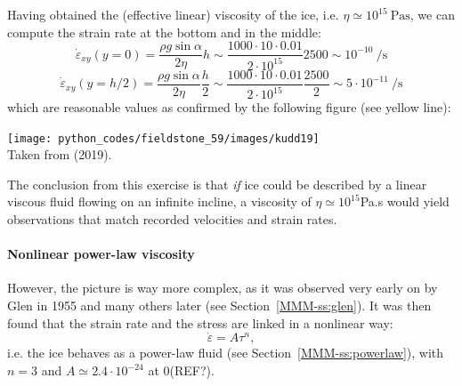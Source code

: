 Having obtained the (effective linear) viscosity of the ice, i.e. 
$\eta\simeq 10^{15}~\si{\pascal\second}$,
we can compute the strain rate at the bottom and in the middle:
\[
\dot{\varepsilon}_{xy}(y=0) 
= \frac{\rho g \sin \alpha}{2 \eta} h
\sim \frac{1000\cdot 10 \cdot 0.01}{2 \cdot 10^{15}}2500
\sim 10^{-10}~\si{\per\second}
\]
\[
\dot{\varepsilon}_{xy}(y=h/2) 
= \frac{\rho g \sin \alpha}{2 \eta} \frac{h}{2}
\sim \frac{1000\cdot 10 \cdot 0.01}{2 \cdot 10^{15}}\frac{2500}{2}
\sim 5\cdot 10^{-11}~\si{\per\second}
\]
which are reasonable values as confirmed by the following figure (see yellow line):  
\begin{center}
\texttt{[image: python\_codes/fieldstone\_59/images/kudd19]}\\
{\captionfont Taken from \textcite{kudd19} (2019).}
\end{center}

The conclusion from this exercise is that {\sl if} ice could be described by 
a linear viscous fluid flowing on an infinite incline, a viscosity of $\eta\simeq 10^{15}$Pa.s
would yield observations that match recorded velocities and strain rates. 


\paragraph{Nonlinear power-law viscosity}
However, the picture is way more complex, as it was observed very early on 
by Glen in 1955 \cite{glen55} and many others later (see Section~\ref{MMM-ss:glen}). 
It was then found that the strain rate and the stress are linked in a nonlinear way: 
\[
\dot{\varepsilon} = A \tau^n,
\]
i.e. the ice behaves as a power-law fluid (see Section~\ref{MMM-ss:powerlaw}), with 
$n=3$ and $A\simeq 2.4\cdot 10^{-24}$ at 0\degree (REF?).


